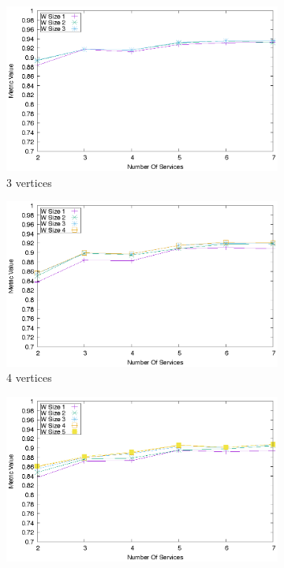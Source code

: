 \begin{figure}[ht]
  \centering
  \begin{subfigure}{0.33\textwidth}
    \includegraphics[width=\textwidth]{Images/graphs/quality_plot_vbad_n3.eps}
    \caption{3 vertices}
    \label{fig:quality_window_bad_a}
  \end{subfigure}
  \hfill
  \begin{subfigure}{0.33\textwidth}
    \includegraphics[width=\textwidth]{Images/graphs/quality_plot_vbad_n4.eps}
    \caption{4 vertices}
    \label{fig:quality_window_bad_b}
  \end{subfigure}
  \hfill
  \begin{subfigure}{0.33\textwidth}
    \includegraphics[width=\textwidth]{Images/graphs/quality_plot_vbad_n5.eps}

\end{subfigure}
\end{figure}
